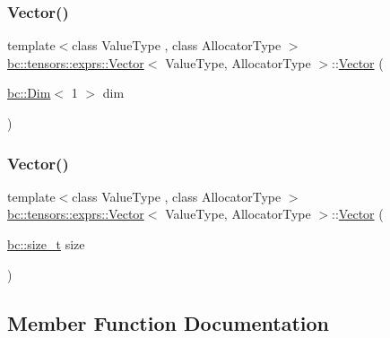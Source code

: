 \subsubsection{\texorpdfstring{Vector()}{Vector()}\hspace{0.1cm}{\footnotesize\ttfamily [4/5]}}
{\footnotesize\ttfamily template$<$class Value\+Type , class Allocator\+Type $>$ \\
\hyperlink{structbc_1_1tensors_1_1exprs_1_1Vector}{bc\+::tensors\+::exprs\+::\+Vector}$<$ Value\+Type, Allocator\+Type $>$\+::\hyperlink{structbc_1_1tensors_1_1exprs_1_1Vector}{Vector} (\begin{DoxyParamCaption}\item[{\hyperlink{structbc_1_1Dim}{bc\+::\+Dim}$<$ 1 $>$}]{dim }\end{DoxyParamCaption})\hspace{0.3cm}{\ttfamily [inline]}}

\mbox{\label{structbc_1_1tensors_1_1exprs_1_1Vector_aa8ca71378f0ab15b4dad2f3a01b5ab6b}} 
\subsubsection{\texorpdfstring{Vector()}{Vector()}\hspace{0.1cm}{\footnotesize\ttfamily [5/5]}}
{\footnotesize\ttfamily template$<$class Value\+Type , class Allocator\+Type $>$ \\
\hyperlink{structbc_1_1tensors_1_1exprs_1_1Vector}{bc\+::tensors\+::exprs\+::\+Vector}$<$ Value\+Type, Allocator\+Type $>$\+::\hyperlink{structbc_1_1tensors_1_1exprs_1_1Vector}{Vector} (\begin{DoxyParamCaption}\item[{\hyperlink{namespacebc_aaf8e3fbf99b04b1b57c4f80c6f55d3c5}{bc\+::size\+\_\+t}}]{size }\end{DoxyParamCaption})\hspace{0.3cm}{\ttfamily [inline]}}



\subsection{Member Function Documentation}
\mbox{\label{structbc_1_1tensors_1_1exprs_1_1Vector_ac6b16e6c0550d3298d31c8fac38047e5}} 
